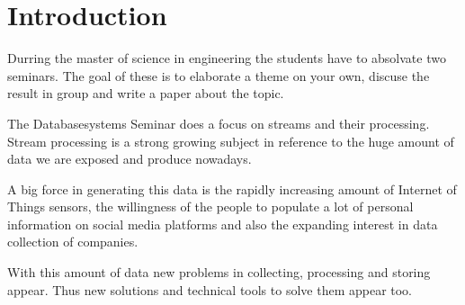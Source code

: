 \chapter{Introduction}
\label{introduction}

Durring the master of science in engineering the students have to absolvate two seminars.
The goal of these is to elaborate a theme on your own, discuse the result in group and write a paper about the topic.

The Databasesystems Seminar does a focus on streams and their processing.
Stream processing is a strong growing subject in reference to the huge amount of data we are exposed and produce nowadays.

A big force in generating this data is the rapidly increasing amount of Internet of Things sensors,
the willingness of the people to populate a lot of personal information on social media platforms and
also the expanding interest in data collection of companies.

With this amount of data new problems in collecting, processing and storing appear.
Thus new solutions and technical tools to solve them appear too.
